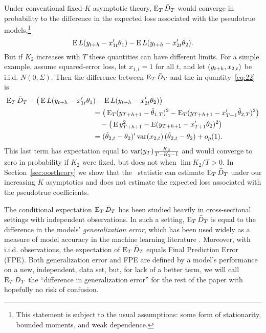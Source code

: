 \documentclass[12pt,draft]{article}
\begin{document}
Under conventional fixed-$K$ asymptotic theory, $\operatorname{E}_T \bar{D}_{T}$ would
converge in probability to the difference in the expected loss
associated with the pseudotrue models,\footnote{%
  This statement is subject to the usual assumptions: some form of
  stationarity, bounded moments, and weak dependence.} %
\begin{equation}\label{eq:22}
  \operatorname{E} L(y_{t+h} - x_{1t}'\theta_{1}) - \operatorname{E} L(y_{t+h} - x_{2t}'\theta_{2}).
\end{equation}
But if $K_2$ increases with $T$ these quantities can have different
limits. For a simple example, assume squared-error loss, let $x_{1,t}
= 1$ for all $t$, and let $(y_{t+h},x_{2,t})$ be i.i.d. $N(0,
\Sigma)$.  Then the difference between $\operatorname{E}_T \bar{D}_{T}$ and
the in quantity~\eqref{eq:22} is
\begin{align*}
  \operatorname{E}_T \bar{D}_{T} - \big(\operatorname{E} L(y_{t+h} - x_{1t}'\theta_{1}&) - \operatorname{E} L(y_{t+h} - x_{2t}'\theta_{2})\big) \\
  &= \big(\operatorname{E}_T (y_{T+h+1} - \hat\theta_{1,T})^2 -
     \operatorname{E}_T (y_{T+h+1} - x_{T+1}'\hat\theta_{2,T})^2\big) \\
     &\quad - \big(\operatorname{E} y_{T+h+1}^2 - \operatorname{E} (y_{T+h+1} - x_{T+1}'\theta_2)^2 \big)\\
  &= (\hat\theta_{2,t} - \theta_2)' \operatorname{var}(x_{2,t})\, (\hat\theta_{2,t} - \theta_2) + o_p(1).
\end{align*}
This last term has expectation equal to $\operatorname{var}(y_T) \frac{K_2}{T - K_2 - 1}$ and
would converge to zero in probability if $K_2$ were fixed, but does not when $\lim
K_2 / T > 0$. In Section~\ref{sec:oostheory} we show that the \oost\
statistic can estimate $\operatorname{E}_T \bar{D}_{T}$ under our increasing $K$
asymptotics and does not estimate the expected loss associated with
the pseudotrue coefficients.

The conditional expectation $\operatorname{E}_T \bar{D}_{T}$ has been studied heavily in
cross-sectional settings with independent observations. In such a
setting, $\operatorname{E}_T \bar{D}_{T}$ is equal to the difference in the models'
\emph{generalization error}, which has been used widely as a measure
of model accuracy in the machine
learning literature \citep[see][for further discussion]{HTF:08}.
Moreover, with i.i.d. observations, the expectation of $\operatorname{E}_T \bar{D}_{T}$
equals \citepos{Aka:69} Final Prediction Error (FPE). Both
generalization error and FPE are defined by a model's
performance on a new, independent, data set, but, for lack of a better
term, we will call $\operatorname{E}_T \bar{D}_{T}$ the ``difference in generalization error''
for the rest of the paper with hopefully no risk of confusion.
\end{document}
